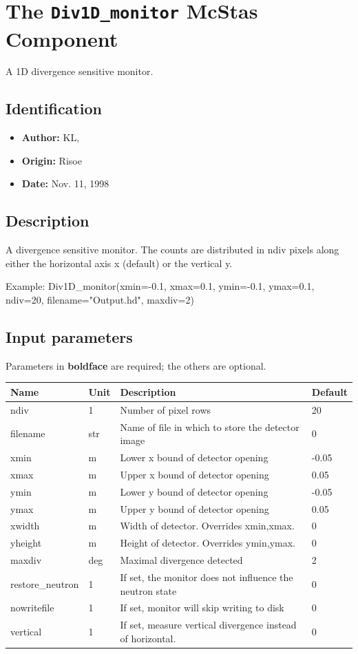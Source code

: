 \section{The \texttt{Div1D\_monitor} McStas Component}
A 1D divergence sensitive monitor.

\subsection*{Identification}
\begin{itemize}
  \item \textbf{Author:} KL,
  \item \textbf{Origin:} Risoe
  \item \textbf{Date:} Nov. 11, 1998
\end{itemize}

\subsection*{Description}
A divergence sensitive monitor. The counts are distributed in ndiv pixels along either the horizontal axis x (default) or the vertical y.

Example: Div1D\_monitor(xmin=-0.1, xmax=0.1, ymin=-0.1, ymax=0.1, ndiv=20, filename="Output.hd", maxdiv=2)

\subsection*{Input parameters}
Parameters in \textbf{boldface} are required; the others are optional.

\begin{longtable}{p{}p{}p{}p{}}
\toprule
\textbf{Name} & \textbf{Unit} & \textbf{Description} & \textbf{Default} \\
\midrule
\endhead
ndiv & 1 & Number of pixel rows & 20 \\
filename & str & Name of file in which to store the detector image & 0 \\
xmin & m & Lower x bound of detector opening & -0.05 \\
xmax & m & Upper x bound of detector opening & 0.05 \\
ymin & m & Lower y bound of detector opening & -0.05 \\
ymax & m & Upper y bound of detector opening & 0.05 \\
xwidth & m & Width of detector. Overrides xmin,xmax. & 0 \\
yheight & m & Height of detector. Overrides ymin,ymax. & 0 \\
maxdiv & deg & Maximal divergence detected & 2 \\
restore\_neutron & 1 & If set, the monitor does not influence the neutron state & 0 \\
nowritefile & 1 & If set, monitor will skip writing to disk & 0 \\
vertical & 1 & If set, measure vertical divergence instead of horizontal. & 0 \\
\bottomrule
\end{longtable}

